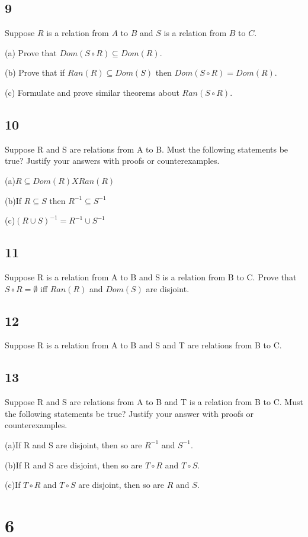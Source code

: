 \documentclass{article}
\begin{document}
\subsection{9}
Suppose $R$ is a relation from $A$ to $B$ and $S$ is a relation from $B$ to $C$. 

(a) Prove that $Dom(S \circ R) \subseteq Dom(R)$.

(b) Prove that if $Ran(R) \subseteq Dom(S)$ then $Dom(S \circ  R) = Dom(R)$.

(c) Formulate and prove similar theorems about $Ran(S \circ R)$.

\subsection{10}
Suppose R and S are relations from A to B. Must the following statements be true? Justify your answers with proofs or counterexamples.

(a)$R\subseteq Dom(R) X Ran(R)$


(b)If $R \subseteq S$ then $R ^{-1} \subseteq S^{-1}$


(c)$(R \cup S)^{-1}= R^{-1} \cup S^{-1}$
\subsection{11}
Suppose R is a relation from A to B and S is a relation from B to C. Prove that $S \circ R = \emptyset$ iff $Ran(R)$ and $Dom(S)$ are disjoint.


\subsection{12}
Suppose R is a relation from A to B and S and T are relations from B to C.
\subsection{13}
Suppose R and S are relations from A to B and T is a relation from B to C. Must the following statements be true? Justify your answer with proofs or counterexamples.

(a)If R and S are disjoint, then so are $R^{-1}$ and $S^{-1}$.

(b)If R and S are disjoint, then so are $T \circ R$ and $T \circ S$.

(c)If $T \circ R$ and $T \circ S$ are disjoint, then so are $R$ and $S$.

\section{6}
\end{document}
